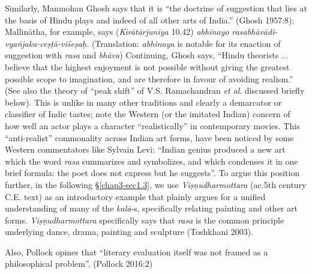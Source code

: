 Similarly, Manmohan Ghosh says that it is “the doctrine of suggestion that lies at the basis of Hindu plays and indeed of all other arts of India.” (Ghosh 1957:8); Mallinātha, for example, says (\textsl{Kirātārjunīya} 10.42) \textsl{abhinayo rasabhāvādi-vyañjaka-ceṣṭā-viśeṣaḥ.} (Translation: \textsl{abhinaya} is notable for its enaction of suggestion with \textsl{rasa} and \textsl{bhāva}) Continuing, Ghosh says, “Hindu theorists ... believe that the highest enjoyment is not possible without giving the greatest possible scope to imagination, and are therefore in favour of avoiding realism.” (See also the theory of “peak shift” of V.S. Ramachandran \textsl{et al}. discussed briefly below). This is unlike in many other traditions and clearly a demarcator or classifier of Indic tastes; note the Western (or the imitated Indian) concern of how well an actor plays a character “realistically” in contemporary movies. This “anti-realist” commonality across Indian art forms, have been noticed by some Western commentators like Sylvain Levi: “Indian genius produced a new art which the word \textsl{rasa} summarizes and symbolizes, and which condenses it in one brief formula: the poet does not express but he suggests”. To argue this position further, in the following \S\ref{chap3-sec1.3}, we use \textsl{Viṣṇudharmottara} (ac.5th century C.E. text) as an introductory example that plainly argues for a unified understanding of many of the \textsl{kalā}-s, specifically relating painting and other art forms. \textsl{Viṣṇudharmottara} specifically says that \textsl{rasa} is the common principle underlying dance, drama, painting and sculpture (Toshkhani 2003).

\newpage

Also, Pollock opines that “literary evaluation itself was not framed as a philosophical problem”. (Pollock 2016:2)

